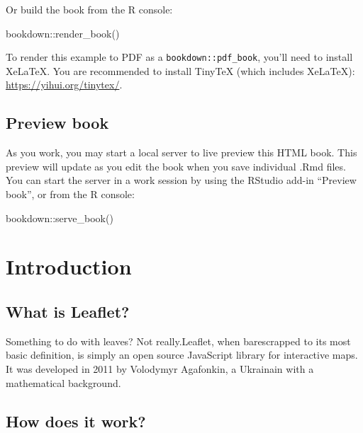 \documentclass[
]{book}
\newenvironment{Shaded}{\begin{snugshade}}{\end{snugshade}}
\newcommand{\FunctionTok}[1]{\textcolor[rgb]{0.00,0.00,0.00}{#1}}
\newcommand{\NormalTok}[1]{#1}
\newcommand{\SpecialCharTok}[1]{\textcolor[rgb]{0.00,0.00,0.00}{#1}}
\theoremstyle{definition}
\theoremstyle{definition}
\theoremstyle{definition}
\theoremstyle{definition}
\theoremstyle{remark}
\begin{document}
Or build the book from the R console:

\begin{Shaded}
\begin{Highlighting}[]
\NormalTok{bookdown}\SpecialCharTok{::}\FunctionTok{render\_book}\NormalTok{()}
\end{Highlighting}
\end{Shaded}

To render this example to PDF as a \texttt{bookdown::pdf\_book}, you'll need to install XeLaTeX. You are recommended to install TinyTeX (which includes XeLaTeX): \url{https://yihui.org/tinytex/}.

\hypertarget{preview-book}{%
\section*{Preview book}\label{preview-book}}

As you work, you may start a local server to live preview this HTML book. This preview will update as you edit the book when you save individual .Rmd files. You can start the server in a work session by using the RStudio add-in ``Preview book'', or from the R console:

\begin{Shaded}
\begin{Highlighting}[]
\NormalTok{bookdown}\SpecialCharTok{::}\FunctionTok{serve\_book}\NormalTok{()}
\end{Highlighting}
\end{Shaded}

\hypertarget{introduction}{%
\chapter{Introduction}\label{introduction}}

\hypertarget{what-is-leaflet}{%
\section{What is Leaflet?}\label{what-is-leaflet}}

Something to do with leaves? Not really.Leaflet, when barescrapped to its most basic definition, is simply an open source JavaScript library for interactive maps. It was developed in 2011 by Volodymyr Agafonkin, a Ukrainain with a mathematical background.

\hypertarget{how-does-it-work}{%
\section{How does it work?}\label{how-does-it-work}}
\end{document}
